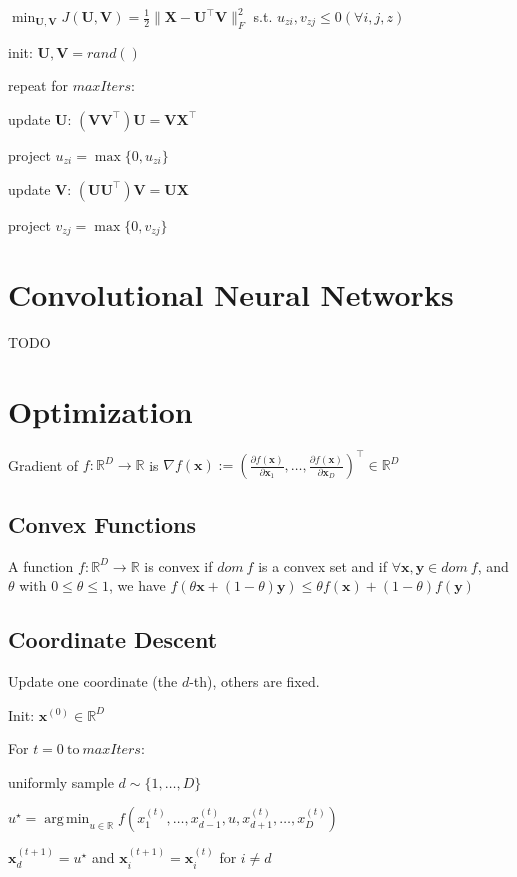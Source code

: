 \documentclass[a4paper, 11pt, landscape]{article}
\DeclareMathOperator*{\argmin}{arg\,min}
\begin{document}
\begin{multicols*}{3}
$\min_{\mathbf{U}, \mathbf{V}} J(\mathbf{U}, \mathbf{V}) = \frac{1}{2} \|\mathbf{X} - \mathbf{U}^\top\mathbf{V}\|_F^2$ s.t. $u_{zi},v_{zj} \leq 0 (\forall i,j,z)$
\begin{inparaenum}
	\item init: $\mathbf{U}, \mathbf{V} = rand()$
	\item repeat for $\mathit{maxIters}$:
	\item update $\mathbf{U}$: $(\mathbf{VV}^\top)\mathbf{U} = \mathbf{VX}^\top$
	\item project $u_{zi} = \max \{ 0, u_{zi} \}$
	\item update $\mathbf{V}$: $(\mathbf{UU}^\top)\mathbf{V} = \mathbf{UX}$
	\item project $v_{zj} = \max \{ 0, v_{zj} \}$
\end{inparaenum}

\section{Convolutional Neural Networks}
TODO

\section{Optimization}
Gradient of $f: \mathbb{R}^D \to \mathbb{R}$ is $\nabla f(\mathbf{x}) := \left( \frac{\partial f(\mathbf{x})}{\partial \mathbf{x}_1}, \ldots, \frac{\partial f(\mathbf{x})}{\partial \mathbf{x}_D} \right)^\top \in \mathbb{R}^D$

\subsection{Convex Functions}
A function $f : \mathbb{R}^D \rightarrow \mathbb{R}$ is convex if $dom\ f$ is a convex set and if $\forall \mathbf{x}, \mathbf{y} \in dom\ f$, and $\theta$ with $0 \leq \theta \leq 1$, we have $f(\theta \mathbf{x} + (1 - \theta)\mathbf{y}) \leq \theta f(\mathbf{x}) + (1-\theta)f(\mathbf{y})$

\subsection{Coordinate Descent}
Update one coordinate (the $d$-th), others are fixed.
\begin{inparaenum}
	\item Init: $\mathbf{x}^{(0)} \in \mathbb{R}^D$
	\item For $t = 0 \ \text{to} \ \mathit{maxIters}$:
	\item uniformly sample $d \sim \{1, \ldots, D\}$
	\item $u^\star = \argmin_{u \in \mathbb{R}} f(x_1^{(t)}, \ldots, x_{d-1}^{(t)}, u, x_{d+1}^{(t)}, \ldots, x_D^{(t)})$
	\item $\mathbf{x}_d^{(t+1)} = u^\star$ and $\mathbf{x}_i^{(t+1)} = \mathbf{x}_i^{(t)}$ for $i \neq d$
\end{inparaenum}


\end{multicols*}
\end{document}
